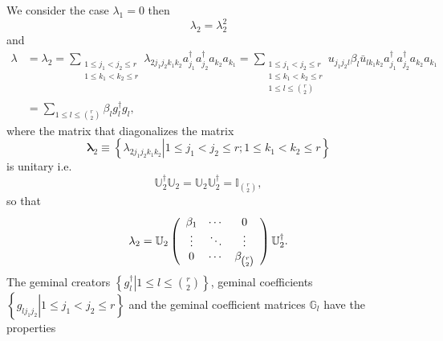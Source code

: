 \documentclass[aps,preprint]{revtex4}%
\begin{document}
We consider the case $\lambda_{1}=0$ then
\begin{equation}
\lambda_{2}=\lambda_{2}^{2} \label{idem2}%
\end{equation}
and%
\begin{align}
\lambda &  =\lambda_{2}=\sum_{\substack{1\leq j_{1}<j_{2}\leq r\\1\leq
k_{1}<k_{2}\leq r}}\lambda_{2j_{1}j_{2}k_{1}k_{2}}a_{j_{1}}^{\dagger}a_{j_{2}%
}^{\dagger}a_{k_{2}}a_{k_{1}}=\sum_{\substack{1\leq j_{1}<j_{2}\leq r\\1\leq
k_{1}<k_{2}\leq r\\1\leq l\leq\binom{r}{2}}}u_{j_{1}j_{2}l}\beta_{l}\bar
{u}_{lk_{1}k_{2}}a_{j_{1}}^{\dagger}a_{j_{2}}^{\dagger}a_{k_{2}}a_{k_{1}%
}\nonumber\\
&  =\sum_{1\leq l\leq\binom{r}{2}}\beta_{l}g_{l}^{\dagger}g_{l},
\label{expan_lamda2}%
\end{align}
where the matrix that diagonalizes the matrix
\begin{equation}
\mathbf{\lambda}_{2}\equiv\left\{  \left.  \lambda_{2j_{1}j_{2}k_{1}k_{2}%
}\right\vert 1\leq j_{1}<j_{2}\leq r;1\leq k_{1}<k_{2}\leq r\right\}
\end{equation}
is unitary i.e.
\begin{equation}
\mathbb{U}_{2}^{\dagger}\mathbb{U}_{2}=\mathbb{U}_{2}\mathbb{U}_{2}^{\dagger
}=\mathbb{I}_{\binom{r}{2}},
\end{equation}
so that
\begin{equation}
\mathbf{\lambda}_{2}=\mathbb{U}_{2}\left(
\begin{array}
[c]{ccc}%
\beta_{1} & \cdots & 0\\
\vdots & \ddots & \vdots\\
0 & \cdots & \beta_{\binom{r}{2}}%
\end{array}
\right)  \mathbb{U}_{2}^{\dagger}.
\end{equation}
The geminal creators $\left\{  \left.  g_{l}^{\dagger}\right\vert 1\leq
l\leq\binom{r}{2}\right\}  $, geminal coefficients $\left\{  \left.
g_{lj_{1}j_{2}}\right\vert 1\leq j_{1}<j_{2}\leq r\right\}  $ and the geminal
coefficient matrices $\mathbb{G}_{l}$ have the properties%
\end{document}
